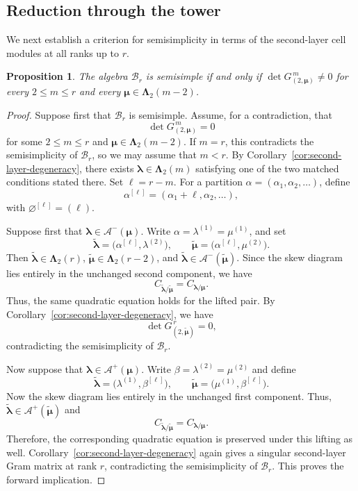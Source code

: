 \documentclass[10pt,a4paper]{amsart}
\newtheorem{proposition}[theorem]{Proposition}
\newcommand{\1}{\mathfrak{1}}
\newcommand{\B}{\mathcal{B}}
\begin{document}
\subsection{Reduction through the tower}
We next establish a criterion for semisimplicity
in terms of the second-layer cell modules at all
ranks up to $r$.

\begin{proposition}\label{prop:exact-all-ranks}
The algebra $\B_r$ is semisimple if and only if
$\det G_{(2,\bm\mu)}^{\,m}\neq0$ for every
$2\leq m\leq r$ and every
$\bm\mu\in\bm\Lambda_2(m-2)$.
\end{proposition}

\begin{proof}
Suppose first that $\B_r$ is semisimple.
Assume, for a contradiction, that
$$
\det G_{(2,\bm\mu)}^{\,m}=0
$$
for some $2\leq m\leq r$ and
$\bm\mu\in\bm\Lambda_2(m-2)$.
If $m=r$, this contradicts the semisimplicity of $\B_r$,
so we may assume that $m<r$.
By Corollary~\ref{cor:second-layer-degeneracy},
there exists $\bm\lambda\in\bm\Lambda_2(m)$ satisfying one of the two matched conditions stated there. Set $\ell=r-m$. For a partition $\alpha=(\alpha_1,\alpha_2,\ldots)$, define
$$
\alpha^{[\ell]}=(\alpha_1+\ell,\alpha_2,\ldots),
$$
with $\varnothing^{[\ell]}=(\ell)$.

Suppose first that $\bm\lambda\in\mathcal A^-(\bm\mu)$. Write $\alpha=\lambda^{(1)}=\mu^{(1)}$, and set
$$
\widetilde{\bm\lambda}
=\bigl(\alpha^{[\ell]},\lambda^{(2)}\bigr),
\qquad
\widetilde{\bm\mu}
=\bigl(\alpha^{[\ell]},\mu^{(2)}\bigr).
$$
Then $\widetilde{\bm\lambda}\in\bm\Lambda_2(r)$,
$\widetilde{\bm\mu}\in\bm\Lambda_2(r-2)$, and
$\widetilde{\bm\lambda}\in
\mathcal A^-(\widetilde{\bm\mu})$.
Since the skew diagram lies entirely in the unchanged
second component, we have
$$
C_{\widetilde{\bm\lambda}/\widetilde{\bm\mu}}
=C_{\bm\lambda/\bm\mu}.
$$
Thus, the same quadratic equation holds for the lifted pair.
By Corollary~\ref{cor:second-layer-degeneracy},
we have
$$
\det G_{(2,\widetilde{\bm\mu})}^{\,r}=0,
$$
contradicting the semisimplicity of $\B_r$.

Now suppose that $\bm\lambda\in\mathcal A^+(\bm\mu)$.
Write $\beta=\lambda^{(2)}=\mu^{(2)}$ and define
$$
\widetilde{\bm\lambda}
=\bigl(\lambda^{(1)},\beta^{[\ell]}\bigr),
\qquad
\widetilde{\bm\mu}
=\bigl(\mu^{(1)},\beta^{[\ell]}\bigr).
$$
Now the skew diagram lies entirely in the unchanged
first component.
Thus,
$\widetilde{\bm\lambda}\in
\mathcal A^+(\widetilde{\bm\mu})$ and
$$
C_{\widetilde{\bm\lambda}/\widetilde{\bm\mu}}
=C_{\bm\lambda/\bm\mu}.
$$
Therefore, the corresponding quadratic equation is
preserved under this lifting as well.
Corollary~\ref{cor:second-layer-degeneracy}
again gives a singular second-layer Gram matrix at
rank $r$, contradicting the semisimplicity of $\B_r$.
This proves the forward implication.


\end{proof}
\end{document}

